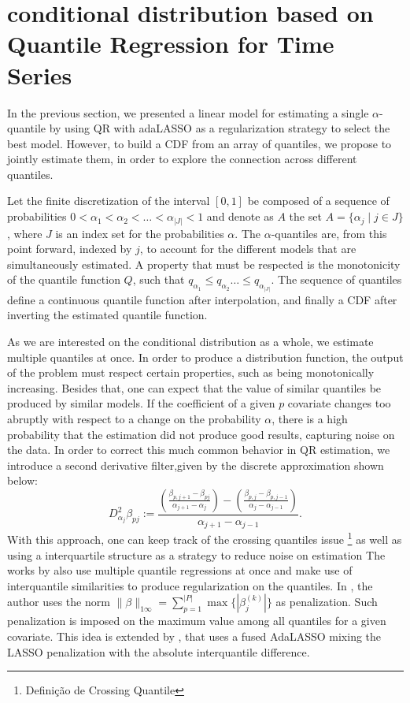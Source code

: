 \section{conditional distribution based on Quantile Regression for Time Series}

In the previous section, we presented a linear model for estimating a single $\alpha$-quantile by using QR with adaLASSO as a regularization strategy to select the best model. However, to build a CDF from an array of quantiles, we propose to jointly estimate them, in order to explore the connection across different quantiles. 

Let the finite discretization of the interval $[0,1]$ be composed of a sequence of probabilities $0 < \alpha_1 < \alpha_2 < \dots < \alpha_{|J|} < 1$ and denote as $A$ the set $A = \{ \alpha_j \mid j \in J \}$, where $J$ is an index set for the probabilities $\alpha$. 
The $\alpha$-quantiles are, from this point forward, indexed by $j$, to account for the different models that are simultaneously estimated. A property that must be respected is the monotonicity of the quantile function $Q$, such that $q_{\alpha_1} \leq q_{\alpha_2} \dots \leq q_{\alpha_{|J|}}$.
The sequence of quantiles define a continuous quantile function after interpolation, and finally a CDF after inverting the estimated quantile function.




As we are interested on the conditional distribution as a whole, we estimate multiple quantiles at once. In order to produce a distribution function, the output of the problem must respect certain properties, such as being monotonically increasing. 
Besides that, one can expect that the value of similar quantiles be produced by similar models. If the coefficient of a given $p$ covariate changes too abruptly with respect to a change on the probability $\alpha$, there is a high probability that the estimation did not produce good results, capturing noise on the data.  In order to correct this much common behavior in QR estimation, we introduce a second derivative filter,given by the discrete approximation shown below:
\begin{equation}
D_{\alpha_j}^{2} \beta_{pj} := \frac{\left(\frac{\beta_{p,j+1}-\beta_{pj}}{\alpha_{j+1}-\alpha_{j}}\right)-\left(\frac{\beta_{p,j}-\beta_{p,j-1}}{\alpha_{j}-\alpha_{j-1}}\right)}{\alpha_{j+1}-\alpha_{j-1}}. 
\end{equation}
With this approach, one can keep track of the crossing quantiles issue \footnote{Definição de Crossing Quantile} %
as well as using a interquartile structure as a strategy to reduce noise on estimation %
The works by \cite{zou_regularized_2008, jiang_interquantile_2014} also use multiple quantile regressions at once and make use of interquantile similarities to produce regularization on the quantiles. In \cite{zou_regularized_2008}, the author uses the norm $\| \beta \|_{1\infty}=\sum_{p=1}^{|P|} \max\{ |\beta_j^{(k)} |\}$ as penalization. Such penalization is imposed on the maximum value among all quantiles for a given covariate. This idea is extended by \cite{jiang_interquantile_2014}, that uses a fused AdaLASSO mixing the LASSO penalization with the absolute interquantile difference.

